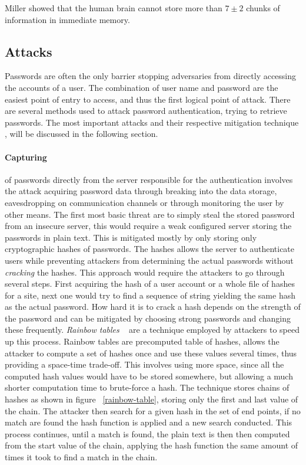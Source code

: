 Miller \cite{magic-seven_miller} showed that the human brain cannot store more than $7\pm 2$ chunks of information in immediate memory.
\subsection{Attacks}
Passwords are often the only barrier stopping adversaries from directly accessing the accounts of a user. The combination of user name and password are the easiest point of entry to access, and thus the first logical point of attack. There are several methods used to attack password authentication, trying to retrieve passwords. The most important attacks and their respective mitigation technique \cite{nist-guide, strong-pws_florencio}, will be discussed in the following section. 
\paragraph{Capturing} of passwords directly from the server responsible for the authentication involves the attack acquiring password data through breaking into the data storage, eavesdropping on communication channels or through monitoring the user by other means. The first most basic threat are to simply steal the stored password from an insecure server, this would require a weak configured server storing the passwords in plain text. This is mitigated mostly by only storing only cryptographic hashes of passwords. The hashes allows the server to authenticate users while preventing attackers from determining the actual passwords without \emph{cracking} the hashes. This approach would require the attackers to go through several steps. First acquiring the hash of a user account or a whole file of hashes for a site, next one would try to find a sequence of string yielding the same hash as the actual password. How hard it is to crack a hash depends on the strength of the password and can be mitigated by choosing strong passwords and changing these frequently.\emph{ Rainbow tables }~\cite{rainbow-tables} are a technique employed by attackers to speed up this process. Rainbow tables are precomputed table of hashes, allows the attacker to compute a set of hashes once and use these values several times, thus providing a space-time trade-off. This involves using more space, since all the computed hash values would have to be stored somewhere, but allowing a much shorter computation time to brute-force a hash. The technique stores chains of hashes as shown in figure ~\ref{rainbow-table}, storing only the first and last value of the chain. The attacker then search for a given hash in the set of end points, if no match are found the hash function is applied and a new search conducted. This process continues, until a match is found, the plain text is then then computed from the start value of the chain, applying the hash function the same amount of times it took to find a match in the chain. 

